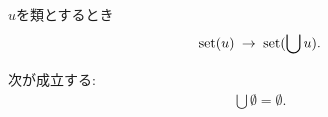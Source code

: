 	\begin{screen}
		\begin{thm}[集合の合併は集合]
			$u$を類とするとき
			\begin{align}
				\operatorname*{set} (u) \hspace{0.25em}\rightarrow\hspace{0.25em} \operatorname*{set} (\bigcup u).
			\end{align}
		\end{thm}
	\end{screen}
	
	\begin{screen}
		\begin{thm}[空集合の合併は空]\label{thm:the_union_of_the_emptyset_is_empty}
			次が成立する:
			\begin{align}
				\bigcup \emptyset = \emptyset.
			\end{align}
		\end{thm}
	\end{screen}
	
